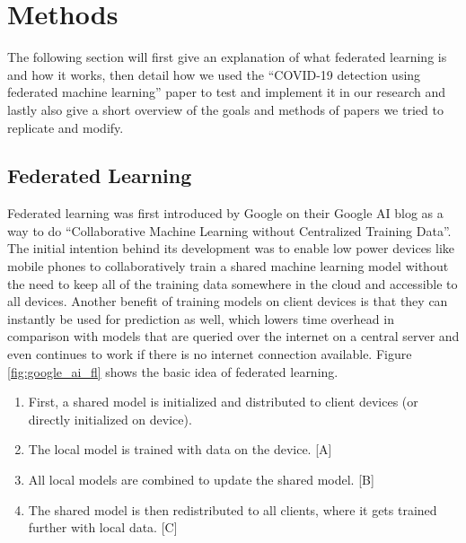 \section{Methods}
The following section will first give an explanation of what federated learning is and how it works, then detail how we used the \enquote{COVID-19 detection using federated machine learning} paper\cite{federated_machine_learning} to test and implement it in our research and lastly also give a short overview of the goals and methods of papers we tried to replicate and modify.

\subsection{Federated Learning}\label{subsec:methods_federated_learning}
Federated learning was first introduced by Google on their Google AI blog as a way to do \enquote{Collaborative Machine Learning without Centralized Training Data}\cite{google_ai_federated_learning}. The initial intention behind its development was to enable low power devices like mobile phones to collaboratively train a shared machine learning model without the need to keep all of the training data somewhere in the cloud and accessible to all devices. Another benefit of training models on client devices is that they can instantly be used for prediction as well, which lowers time overhead in comparison with models that are queried over the internet on a central server and even continues to work if there is no internet connection available.
Figure \ref{fig:google_ai_fl} shows the basic idea of federated learning. 

\begin{enumerate}
    \item First, a shared model is initialized and distributed to client devices (or directly initialized on device).
    \item The local model is trained with data on the device. [A]
    \item All local models are combined to update the shared model. [B] 
    \item The shared model is then redistributed to all clients, where it gets trained further with local data. [C]
\end{enumerate}

